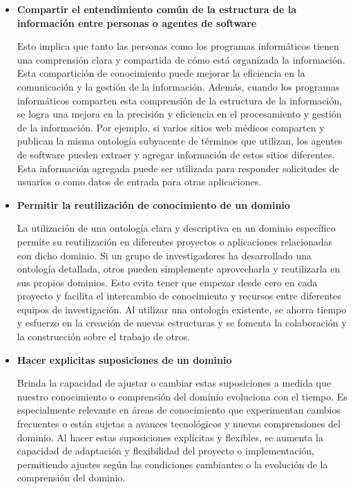 \documentclass[10pt, a4paper,openany]{book}
\theoremstyle{definition}
\begin{document}
\begin{itemize}
    \item \textbf{Compartir el entendimiento común de la estructura de la información entre personas o agentes de software}
    
    Esto implica que tanto las personas como los programas informáticos tienen una comprensión clara y compartida de cómo está organizada la información.
    Esta compartición de conocimiento puede mejorar la eficiencia en la comunicación y la gestión de la información.
    Además, cuando los programas informáticos comparten esta comprensión de la estructura de la información, se logra una mejora en la precisión y eficiencia en el procesamiento y gestión de la información.
    Por ejemplo, si varios sitios web médicos comparten y publican la misma ontología subyacente de términos que utilizan, los agentes de software pueden extraer y agregar información de estos sitios diferentes.
    Esta información agregada puede ser utilizada para responder solicitudes de usuarios o como datos de entrada para otras aplicaciones.
    \item \textbf{Permitir la reutilización de conocimiento de un dominio}

    La utilización de una ontología clara y descriptiva en un dominio específico permite su reutilización en diferentes proyectos o aplicaciones relacionadas con dicho dominio.
    Si un grupo de investigadores ha desarrollado una ontología detallada, otros pueden simplemente aprovecharla y reutilizarla en sus propios dominios.
    Esto evita tener que empezar desde cero en cada proyecto y facilita el intercambio de conocimiento y recursos entre diferentes equipos de investigación.
    Al utilizar una ontología existente, se ahorra tiempo y esfuerzo en la creación de nuevas estructuras y se fomenta la colaboración y la construcción sobre el trabajo de otros.

    \item \textbf{Hacer explicitas suposiciones de un dominio}
    
    Brinda la capacidad de ajustar o cambiar estas suposiciones a medida que nuestro conocimiento o comprensión del dominio evoluciona con el tiempo.
    Es especialmente relevante en áreas de conocimiento que experimentan cambios frecuentes o están sujetas a avances tecnológicos y nuevas comprensiones del dominio.
    Al hacer estas suposiciones explícitas y flexibles, se aumenta la capacidad de adaptación y flexibilidad del proyecto o implementación, permitiendo ajustes según las condiciones cambiantes o la evolución de la comprensión del dominio.
    

\end{itemize}
\end{document}
